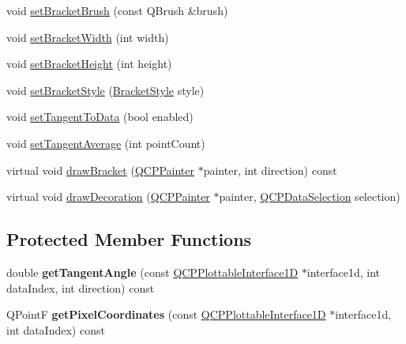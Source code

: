 \begin{DoxyCompactItemize}
void \hyperlink{class_q_c_p_selection_decorator_bracket_a2f4ea0bfb0ea980252b76dd349dd53aa}{set\+Bracket\+Brush} (const Q\+Brush \&brush)
\item 
void \hyperlink{class_q_c_p_selection_decorator_bracket_a291b59cab98ce93a0a3c85963fe10f5e}{set\+Bracket\+Width} (int width)
\item 
void \hyperlink{class_q_c_p_selection_decorator_bracket_aed773ad737201cca40efc6fe451acad8}{set\+Bracket\+Height} (int height)
\item 
void \hyperlink{class_q_c_p_selection_decorator_bracket_a04507697438f6ad8cc2aeea5422dcbe5}{set\+Bracket\+Style} (\hyperlink{class_q_c_p_selection_decorator_bracket_aa6d18517ec0553575bbef0de4252336e}{Bracket\+Style} style)
\item 
void \hyperlink{class_q_c_p_selection_decorator_bracket_a93bc6086e53a5e40a08641a7b2e2cdd5}{set\+Tangent\+To\+Data} (bool enabled)
\item 
void \hyperlink{class_q_c_p_selection_decorator_bracket_adb2d0876f25a77c88042b70818f1d6e4}{set\+Tangent\+Average} (int point\+Count)
\item 
virtual void \hyperlink{class_q_c_p_selection_decorator_bracket_a57b65b5508d5bd0f27c9318f3d4646be}{draw\+Bracket} (\hyperlink{class_q_c_p_painter}{Q\+C\+P\+Painter} $\ast$painter, int direction) const
\item 
virtual void \hyperlink{class_q_c_p_selection_decorator_bracket_a1ceb893063ea3d7197a24098018f4bfb}{draw\+Decoration} (\hyperlink{class_q_c_p_painter}{Q\+C\+P\+Painter} $\ast$painter, \hyperlink{class_q_c_p_data_selection}{Q\+C\+P\+Data\+Selection} selection)
\end{DoxyCompactItemize}
\subsection*{Protected Member Functions}
\begin{DoxyCompactItemize}
\item 
\mbox{\label{class_q_c_p_selection_decorator_bracket_ac002e20586950bf5c91a399863769c61}} 
double {\bfseries get\+Tangent\+Angle} (const \hyperlink{class_q_c_p_plottable_interface1_d}{Q\+C\+P\+Plottable\+Interface1D} $\ast$interface1d, int data\+Index, int direction) const
\item 
\mbox{\label{class_q_c_p_selection_decorator_bracket_a9925ed667e8a645fcb9949bd02ee4a19}} 
Q\+PointF {\bfseries get\+Pixel\+Coordinates} (const \hyperlink{class_q_c_p_plottable_interface1_d}{Q\+C\+P\+Plottable\+Interface1D} $\ast$interface1d, int data\+Index) const
\end{DoxyCompactItemize}
